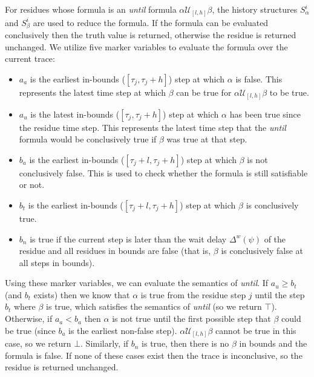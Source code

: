 For residues whose formula is an \emph{until} formula $\alpha \mathcal{U}_{[l,h]} \beta$, the history structures $S^i_\alpha$ and $S^i_\beta$ are used to reduce the formula. 
If the formula can be evaluated conclusively then the truth value is returned, otherwise the residue is returned unchanged. 
We utilize five marker variables to evaluate the formula over the current trace: 
\begin{itemize}
\item $a_a$ is the earliest in-bounds ($[\tau_j,\tau_j+h]$) step at which $\alpha$ is false. This represents the latest time step at which $\beta$ can be true for $\alpha \mathcal{U}_{[l,h]} \beta$ to be true. 
\item $a_u$ is the latest in-bounds ($[\tau_j,\tau_j+h]$) step at which $\alpha$ has been true since the residue time step.  This represents the latest time step that the \emph{until} formula would be conclusively true if $\beta$ was true at that step. 
\item $b_a$ is the earliest in-bounds ($[\tau_j+l,\tau_j+h]$) step at which $\beta$ is not conclusively false. This is used to check whether the formula is still satisfiable or not.
\item $b_t$ is the earliest in-bounds ($[\tau_j+l,\tau_j+h]$) step at which $\beta$ is conclusively true.
\item $b_n$ is true if the current step is later than the wait delay $\Delta^w(\psi)$ of the residue and all residues in bounds are false (that is, $\beta$ is conclusively false at all steps in bounds).
\end{itemize}

Using these marker variables, we can evaluate the semantics of \emph{until}. If $a_u \geq b_t$ (and $b_t$ exists) then we know that $\alpha$ is true from the residue step $j$ until the step $b_t$ where $\beta$ is true, which satisfies the semantics of \emph{until} (so we return $\top$).
%
Otherwise, if $a_a < b_a$ then $\alpha$ is not true until the first possible step that $\beta$ could be true (since $b_a$ is the earliest non-false step). $\alpha \mathcal{U}_{[l,h]} \beta$ cannot be true in this case, so we return $\bot$. Similarly, if $b_n$ is true, then there is no $\beta$ in bounds and the formula is false.
%
If none of these cases exist then the trace is inconclusive, so the residue is returned unchanged.



